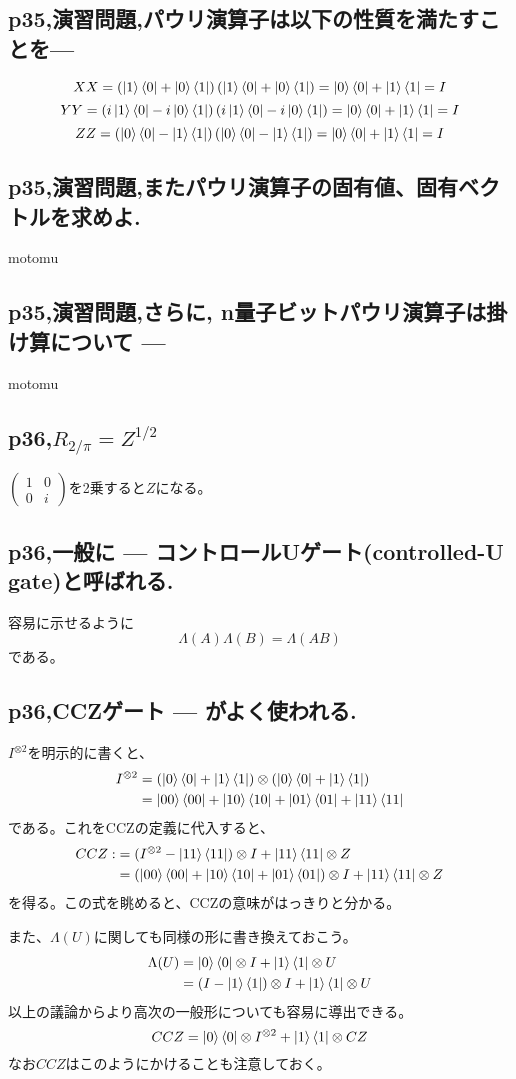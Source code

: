 \documentclass[b5paper,fleqn]{ltjsarticle}
\newcommand\s[1]{\subsection*{#1}\noindent\ignorespaces}
\newcommand\al[1]{\begin{align*}#1\end{align*}}
\newcommand\mat[2]{\left(\begin{array}{#1}#2\end{array}\right)}
\begin{document}
\s{p35,演習問題,パウリ演算子は以下の性質を満たすことを---}
\[XX=\left(\ket{1}\bra{0}+\ket{0}\bra{1}\right)\left(\ket{1}\bra{0}+\ket{0}\bra{1}\right)
=\ket{0}\bra{0}+\ket{1}\bra{1}=I\]
\[YY=\left(i\ket{1}\bra{0}-i\ket{0}\bra{1}\right)\left(i\ket{1}\bra{0}-i\ket{0}\bra{1}\right)
=\ket{0}\bra{0}+\ket{1}\bra{1}=I\]
\[ZZ=\left(\ket{0}\bra{0}-\ket{1}\bra{1}\right)\left(\ket{0}\bra{0}-\ket{1}\bra{1}\right)
=\ket{0}\bra{0}+\ket{1}\bra{1}=I\]
\s{p35,演習問題,またパウリ演算子の固有値、固有ベクトルを求めよ.}
motomu
\s{p35,演習問題,さらに, n量子ビットパウリ演算子は掛け算について ---}
motomu
\s{p36,$R_{2/\pi}=Z^{1/2}$}
$\mat{cc}{1&0\\0&i}$を2乗すると$Z$になる。
\s{p36,一般に --- コントロールUゲート(controlled-U gate)と呼ばれる.}
容易に示せるように
\[\Lambda(A)\Lambda(B)=\Lambda(AB)\]
である。
\s{p36,CCZゲート --- がよく使われる.}
$I^{\otimes2}$を明示的に書くと、
\al{
  I^{\otimes2}
&=(\ket{0}\bra{0}+\ket{1}\bra{1})\otimes(\ket{0}\bra{0}+\ket{1}\bra{1})\\
&=\ket{00}\bra{00}+\ket{10}\bra{10}+\ket{01}\bra{01}+\ket{11}\bra{11}
}である。これをCCZの定義に代入すると、
\al{
CCZ:&=(I^{\otimes 2}-\ket{11}\bra{11})\otimes I+\ket{11}\bra{11}\otimes Z\\
&=(\ket{00}\bra{00}+\ket{10}\bra{10}+\ket{01}\bra{01})\otimes I+\ket{11}\bra{11}\otimes Z
}を得る。この式を眺めると、CCZの意味がはっきりと分かる。\par
また、$\Lambda(U)$に関しても同様の形に書き換えておこう。
\al{\Lambda(U)
&=\ket{0}\bra{0}\otimes I+\ket{1}\bra{1}\otimes U\\
&=(I-\ket{1}\bra{1})\otimes I+\ket{1}\bra{1}\otimes U
}
以上の議論からより高次の一般形についても容易に導出できる。
\[CCZ=\ket{0}\bra{0}\otimes I^{\otimes 2}+\ket{1}\bra{1}\otimes CZ\]
なお$CCZ$はこのようにかけることも注意しておく。
\end{document}
